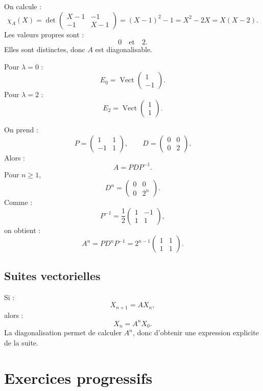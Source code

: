 \documentclass[11pt,a4paper]{article}
\newcommand{\Vect}{\operatorname{Vect}}
\begin{document}
\begin{correctionbox}
On calcule :
\[
\chi_A(X)=
\det
\begin{pmatrix}
X-1&-1\\
-1&X-1
\end{pmatrix}
=
(X-1)^2-1
=
X^2-2X
=
X(X-2).
\]
Les valeurs propres sont :
\[
0
\quad\text{et}\quad
2.
\]
Elles sont distinctes, donc \(A\) est diagonalisable.

Pour \(\lambda=0\) :
\[
E_0=\Vect
\begin{pmatrix}
1\\-1
\end{pmatrix}.
\]
Pour \(\lambda=2\) :
\[
E_2=\Vect
\begin{pmatrix}
1\\1
\end{pmatrix}.
\]

On prend :
\[
P=
\begin{pmatrix}
1&1\\
-1&1
\end{pmatrix},
\qquad
D=
\begin{pmatrix}
0&0\\
0&2
\end{pmatrix}.
\]
Alors :
\[
A=PDP^{-1}.
\]
Pour \(n\geq1\),
\[
D^n=
\begin{pmatrix}
0&0\\
0&2^n
\end{pmatrix}.
\]
Comme :
\[
P^{-1}
=
\frac12
\begin{pmatrix}
1&-1\\
1&1
\end{pmatrix},
\]
on obtient :
\[
A^n
=
PD^nP^{-1}
=
2^{n-1}
\begin{pmatrix}
1&1\\
1&1
\end{pmatrix}.
\]
\end{correctionbox}

\subsection{Suites vectorielles}

Si :
\[
X_{n+1}=AX_n,
\]
alors :
\[
X_n=A^nX_0.
\]
La diagonalisation permet de calculer \(A^n\), donc d'obtenir une expression explicite de la suite.

\newpage
\section{Exercices progressifs}
\end{document}
